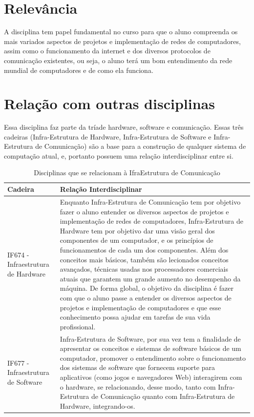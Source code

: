 \documentclass[10pt, a4paper]{article}
\begin{document}
\section{Relevância}

A disciplina tem papel fundamental no curso para que o aluno compreenda os mais variados aspectos de projetos e implementação de redes de computadores, assim como o funcionamento da internet e dos diversos protocolos de comunicação existentes, ou seja, o aluno terá um bom entendimento da rede mundial de computadores e de como ela funciona.

\section{Relação com outras disciplinas}

Essa disciplina faz parte da tríade hardware, software e comunicação. Essas três cadeiras (Infra-Estrutura de Hardware, Infra-Estrutura de Software e Infra-Estrutura de Comunicação) são a base para a construção de qualquer sistema de computação atual, e, portanto possuem uma relação interdisciplinar entre si.\\[0.5cm]

\begin{table}[h]
\centering
\begin{tabular}{|l|p{8cm}|} \hline
\textbf{Cadeira} & \textbf{Relação Interdisciplinar}\\\hline
IF674 - Infraestrutura de Hardware & Enquanto Infra-Estrutura de Comunicação tem por objetivo fazer o aluno entender os diversos aspectos de projetos e implementação de redes de computadores, Infra-Estrutura de Hardware tem por objetivo dar uma visão geral dos componentes de um computador, e os princípios de funcionamentos de cada um dos componentes. Além dos conceitos mais básicos, também são lecionados conceitos avançados, técnicas usadas nos processadores comerciais atuais que garantem um grande aumento no desempenho da máquina. De forma global, o objetivo da disciplina é fazer com que o aluno passe a entender os diversos aspectos de projetos e implementação de computadores e que esse conhecimento possa ajudar em tarefas de sua vida profissional.\\\hline
IF677 - Infraestrutura de Software & Infra-Estrutura de Software, por sua vez tem a finalidade de apresentar os conceitos e sistemas de software básicos de um computador, promover o entendimento sobre o funcionamento dos sistemas de software que fornecem suporte para aplicativos (como jogos e navegadores Web) interagirem com o hardware, se relacionando, desse modo, tanto com Infra-Estrutura de Comunicação quanto com Infra-Estrutura de Hardware, integrando-os.\\\hline
\end{tabular}
\caption{Disciplinas que se relacionam à IfraEstrutura de Comunicação}
\end{table}



\end{document}
